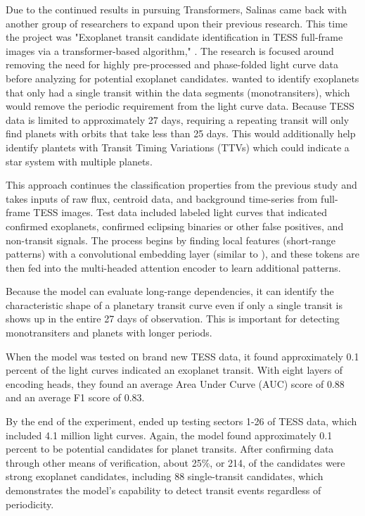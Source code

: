 \documentclass[letterpaper]{article} %
\begin{document}
Due to the continued results in pursuing Transformers, Salinas came back with another group of researchers to expand upon their previous research. This time the project was "Exoplanet transit candidate identification in TESS full-frame images via a transformer-based algorithm," \cite{salinas2025tessfullframe}. The research is focused around removing the need for highly pre-processed and phase-folded light curve data before analyzing for potential exoplanet candidates. \citeauthor{salinas2025tessfullframe} wanted to identify exoplanets that only had a single transit within the data segments (monotransiters), which would remove the periodic requirement from the light curve data. Because TESS data is limited to approximately 27 days, requiring a repeating transit will only find planets with orbits that take less than 25 days. This would additionally help identify plantets with Transit Timing Variations (TTVs) which could indicate a star system with multiple planets.

This approach continues the classification properties from the previous study \cite{salinas2023distinguishingtransitfalsepositives} and takes inputs of raw flux, centroid data, and background time-series from full-frame TESS images. Test data included labeled light curves that indicated confirmed exoplanets, confirmed eclipsing binaries or other false positives, and non-transit signals. The process begins by finding local features (short-range patterns) with a convolutional embedding layer (similar to \cite{salinas2023distinguishingtransitfalsepositives}), and these tokens are then fed into the multi-headed attention encoder to learn additional patterns.

Because the model can evaluate long-range dependencies, it can identify the characteristic shape of a planetary transit curve even if only a single transit is shows up in the entire 27 days of observation. This is important for detecting monotransiters and planets with longer periods.

When the model was tested on brand new TESS data, it found approximately 0.1 percent of the light curves indicated an exoplanet transit. With eight layers of encoding heads, they found an average Area Under Curve (AUC) score of 0.88 and an average F1 score of 0.83.

By the end of the experiment, \citeauthor{salinas2025tessfullframe} ended up testing sectors 1-26 of TESS data, which included 4.1 million light curves. Again, the model found approximately 0.1 percent to be potential candidates for planet transits. After confirming data through other means of verification, about 25\%, or 214, of the candidates were strong exoplanet candidates, including 88 single-transit candidates, which demonstrates the model's capability to detect transit events regardless of periodicity.
\end{document}

